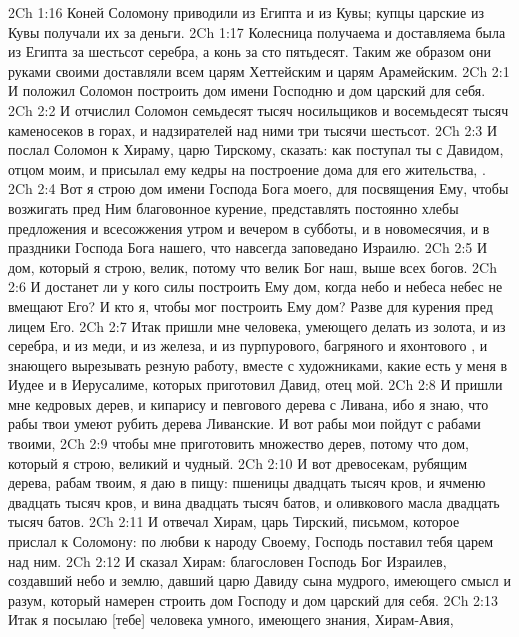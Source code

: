 \vs 2Ch 1:16 Коней Соломону приводили из Египта и из Кувы; купцы царские из Кувы получали их за деньги.
\vs 2Ch 1:17 Колесница получаема и доставляема была из Египта за шестьсот  серебра, а конь за сто пятьдесят. Таким же образом они руками своими доставляли  всем царям Хеттейским и царям Арамейским.
\vs 2Ch 2:1 И положил Соломон построить дом имени Господню и дом царский для себя.
\vs 2Ch 2:2 И отчислил Соломон семьдесят тысяч носильщиков и восемьдесят тысяч каменосеков в горах, и надзирателей над ними три тысячи шестьсот.
\vs 2Ch 2:3 И послал Соломон к Хираму, царю Тирскому, сказать: как поступал ты с Давидом, отцом моим, и присылал ему кедры на построение дома для его жительства, .
\vs 2Ch 2:4 Вот я строю дом имени Господа Бога моего, для посвящения Ему, чтобы возжигать пред Ним благовонное курение, представлять постоянно хлебы предложения и  всесожжения утром и вечером в субботы, и в новомесячия, и в праздники Господа Бога нашего, что навсегда заповедано Израилю.
\vs 2Ch 2:5 И дом, который я строю, велик, потому что велик Бог наш, выше всех богов.
\vs 2Ch 2:6 И достанет ли у кого силы построить Ему дом, когда небо и небеса небес не вмещают Его? И кто я, чтобы мог построить Ему дом? Разве  для курения пред лицем Его.
\vs 2Ch 2:7 Итак пришли мне человека, умеющего делать  из золота, и из серебра, и из меди, и из железа, и из  пурпурового, багряного и яхонтового , и знающего вырезывать резную работу, вместе с художниками, какие есть у меня в Иудее и в Иерусалиме, которых приготовил Давид, отец мой.
\vs 2Ch 2:8 И пришли мне кедровых дерев, и кипарису и певгового дерева с Ливана, ибо я знаю, что рабы твои умеют рубить дерева Ливанские. И вот рабы мои пойдут с рабами твоими,
\vs 2Ch 2:9 чтобы мне приготовить множество дерев, потому что дом, который я строю, великий и чудный.
\vs 2Ch 2:10 И вот древосекам, рубящим дерева, рабам твоим, я даю в пищу: пшеницы двадцать тысяч кров, и ячменю двадцать тысяч кров, и вина двадцать тысяч батов, и оливкового масла двадцать тысяч батов.
\rsbpar\vs 2Ch 2:11 И отвечал Хирам, царь Тирский, письмом, которое прислал к Соломону: по любви к народу Своему, Господь поставил тебя царем над ним.
\vs 2Ch 2:12 И  сказал Хирам: благословен Господь Бог Израилев, создавший небо и землю, давший царю Давиду сына мудрого, имеющего смысл и разум, который намерен строить дом Господу и дом царский для себя.
\vs 2Ch 2:13 Итак я посылаю [тебе] человека умного, имеющего знания, Хирам-Авия,
